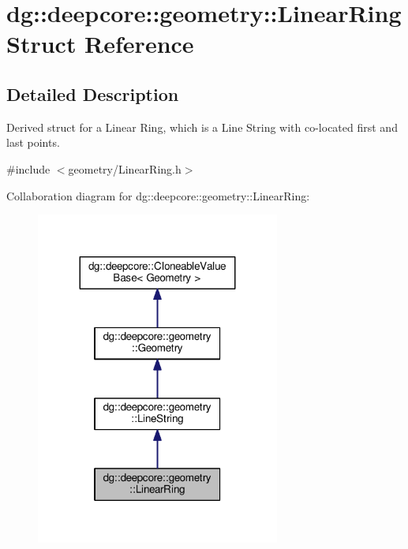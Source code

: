 \hypertarget{structdg_1_1deepcore_1_1geometry_1_1_linear_ring}{}\section{dg\+:\+:deepcore\+:\+:geometry\+:\+:Linear\+Ring Struct Reference}
\label{structdg_1_1deepcore_1_1geometry_1_1_linear_ring}


\subsection{Detailed Description}
Derived struct for a Linear Ring, which is a Line String with co-\/located first and last points. 

{\ttfamily \#include $<$geometry/\+Linear\+Ring.\+h$>$}



Collaboration diagram for dg\+:\+:deepcore\+:\+:geometry\+:\+:Linear\+Ring\+:
\nopagebreak
\begin{figure}[H]
\begin{center}
\leavevmode
\includegraphics[width=227pt]{structdg_1_1deepcore_1_1geometry_1_1_linear_ring__coll__graph}
\end{center}
\end{figure}
